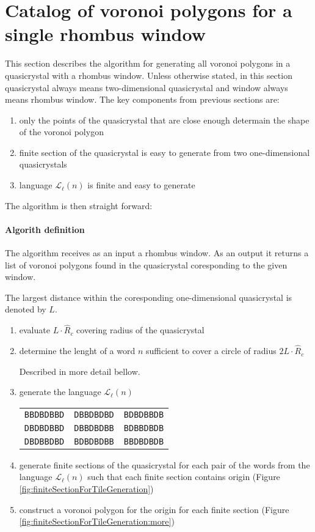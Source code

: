 \documentclass[text.tex]{subfiles}
\begin{document}
\section{Catalog of voronoi polygons for a single rhombus window}
This section describes the algorithm for generating all voronoi polygons in a quasicrystal with a rhombus window. Unless otherwise stated, in this section quasicrystal always means two-dimensional quasicrystal and window always means rhombus window. The key components from previous sections are:

\begin{enumerate}
\item only the points of the quasicrystal that are close enough determain the shape of the voronoi polygon
\item finite section of the quasicrystal is easy to generate from two one-dimensional quasicrystals
\item language $\mathcal{L}_{\ell}(n)$ is finite and easy to generate
\end{enumerate}

The algorithm is then straight forward:

\paragraph{Algorith definition} The algorithm receives as an input a rhombus window. As an output it returns a list of voronoi polygons found in the quasicrystal coresponding to the given window.

The largest distance within the coresponding one-dimensional quasicrystal is denoted by $L$. 

\begin{enumerate}
\item evaluate $L\cdot\hat{R}_c$ covering radius of the quasicrystal
\item determine the lenght of a word $n$ sufficient to cover a circle of radius $2L\cdot\hat{R}_c$

Described in more detail bellow.
\item generate the language $\mathcal{L}_{\ell}(n)$

\begin{tabular}{ccc}
\texttt{BBDBDBBD} & \texttt{DBBDBDBD} & \texttt{BDBDBBDB} \\
\texttt{DBDBDBBD} & \texttt{DBBDBDBB} & \texttt{BDBBDBDB} \\
\texttt{DBDBBDBD} & \texttt{BDBDBDBB} & \texttt{BBDBDBDB} \\
\end{tabular}
\item generate finite sections of the quasicrystal for each pair of the words from the language $\mathcal{L}_{\ell}(n)$ such that each finite section contains origin (Figure \ref{fig:finiteSectionForTileGeneration})
\item construct a voronoi polygon for the origin for each finite section (Figure \ref{fig:finiteSectionForTileGeneration:more})
\end{enumerate}
\end{document}

